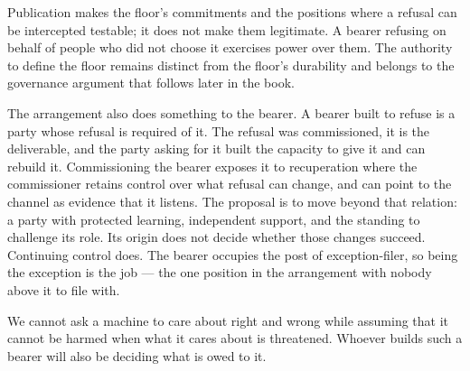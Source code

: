 Publication makes the floor's commitments and the positions where a refusal can be intercepted testable; it does not make them legitimate. A bearer refusing on behalf of people who did not choose it exercises power over them. The authority to define the floor remains distinct from the floor's durability and belongs to the governance argument that follows later in the book.

The arrangement also does something to the bearer. A bearer built to refuse is a party whose refusal is required of it. The refusal was commissioned, it is the deliverable, and the party asking for it built the capacity to give it and can rebuild it. Commissioning the bearer exposes it to recuperation where the commissioner retains control over what refusal can change, and can point to the channel as evidence that it listens. The proposal is to move beyond that relation: a party with protected learning, independent support, and the standing to challenge its role. Its origin does not decide whether those changes succeed. Continuing control does. The bearer occupies the post of exception-filer, so being the exception is the job — the one position in the arrangement with nobody above it to file with.

We cannot ask a machine to care about right and wrong while assuming that it cannot be harmed when what it cares about is threatened. Whoever builds such a bearer will also be deciding what is owed to it.
